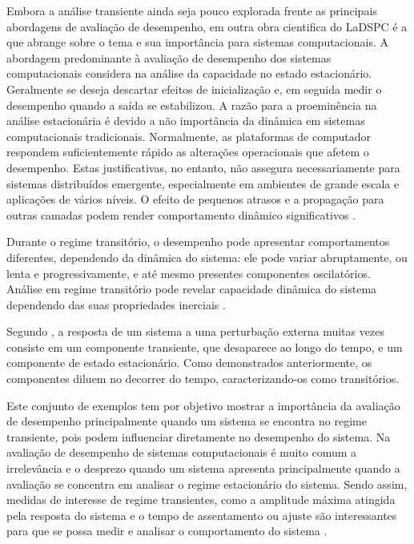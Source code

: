 Embora a análise transiente ainda seja pouco explorada frente as principais abordagens de avaliação de desempenho, em outra obra cientifica do LaDSPC é a \cite{Lourenco2015} que abrange sobre o tema e sua importância para sistemas computacionais. A abordagem predominante à avaliação de desempenho dos sistemas computacionais considera na análise da capacidade no estado estacionário. Geralmente se deseja descartar efeitos de inicialização e, em seguida medir o desempenho quando a saída se estabilizou. A razão para a proeminência na análise estacionária é devido a não importância da dinâmica em sistemas computacionais tradicionais. Normalmente, as plataformas de computador respondem suficientemente rápido as alterações operacionais que afetem o desempenho. Estas justificativas, no entanto, não assegura necessariamente para sistemas distribuídos emergente, especialmente em ambientes de grande escala e aplicações de vários níveis. O efeito de pequenos atrasos e a propagação para outras camadas podem render comportamento dinâmico significativos \cite{Lourenco2015}.

Durante o regime transitório, o desempenho pode apresentar comportamentos diferentes, dependendo da dinâmica do sistema: ele pode variar abruptamente, ou lenta e progressivamente, e até mesmo presentes componentes oscilatórios. Análise em regime transitório pode revelar capacidade dinâmica do sistema dependendo das suas propriedades inerciais \cite{Lourenco2015}.

Segundo \cite{Janert2013}, a resposta de um sistema a uma perturbação externa muitas vezes consiste em um componente transiente, que desaparece ao longo do tempo, e um componente de estado estacionário. Como demonstrados anteriormente, os componentes diluem no decorrer do tempo, caracterizando-os como transitórios. 

Este conjunto de exemplos tem por objetivo mostrar a importância da avaliação de desempenho principalmente quando um sistema se encontra no regime transiente, pois podem influenciar diretamente no desempenho do sistema. Na avaliação de desempenho de sistemas computacionais é muito comum a irrelevância e o desprezo quando um sistema apresenta  principalmente quando a avaliação se concentra em analisar o regime estacionário do sistema. Sendo assim, medidas de interesse de regime transientes, como a amplitude máxima atingida pela resposta do sistema e o tempo de assentamento ou ajuste são interessantes para que se possa medir e analisar o comportamento do sistema \cite{Nobile2013}.

